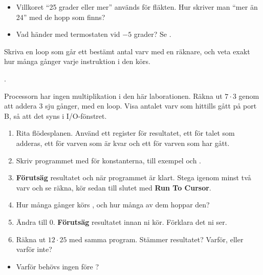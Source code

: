 \begin{itemize}
  \item Villkoret \enquote{25 grader eller mer} används för fläkten. Hur skriver man \enquote{mer
    än 24} med de hopp som finns?
  \item Vad händer med termostaten vid $-5$ grader? Se .
\end{itemize}


\label{lab3:d14}
Skriva en loop som går ett bestämt antal varv med en räknare, och veta exakt hur många gånger
varje instruktion i den körs.

.

Processorn har ingen multiplikation i den här laborationen. Räkna ut $7 \cdot 3$ genom att addera 3
sju gånger, med en loop. Visa antalet varv som hittills gått på port B, så att det syns i
I/O-fönstret.

\begin{enumerate}
  \item Rita flödesplanen. Använd ett register för resultatet, ett för talet som adderas, ett för
    varven som är kvar och ett för varven som har gått.
  \item Skriv programmet med  för konstanterna, till exempel  och
    .
  \item \textbf{Förutsäg} resultatet och  när programmet är klart. Stega igenom minst
    två varv och se  räkna, kör sedan till slutet med \textbf{Run To Cursor}.
  \item Hur många gånger körs , och hur många av dem hoppar den?
  \item Ändra  till 0. \textbf{Förutsäg} resultatet innan ni kör. Förklara det ni ser.
  \item Räkna ut $12 \cdot 25$ med samma program. Stämmer resultatet? Varför, eller varför inte?
\end{enumerate}

\begin{itemize}
  \item Varför behövs ingen  före ?
\end{itemize}


